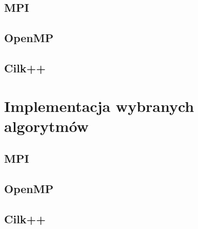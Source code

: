 \documentclass[a4paper,oneside,leqno,12pt]{book}
\theoremstyle{definition}
\theoremstyle{plain}
\theoremstyle{remark}
\begin{document}
\section{MPI}
\section{OpenMP}
\section{Cilk++}

\chapter{Implementacja wybranych algorytmów}
\section{MPI}
\section{OpenMP}
\section{Cilk++}



\end{document}
